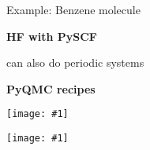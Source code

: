 \newcommand{\mycode}[1]{
\vspace{-1em}
\begin{minipage}[c]{.45\textwidth}

\end{minipage}
}

\newcommand{\mygraphic}[1]{
\begin{minipage}[c]{.48\textwidth}
\texttt{[image: \#1]}
\end{minipage}
}

\begin{frame}{Example: Benzene molecule}
\vspace{1em}
\begin{minipage}{1.05\textwidth}
\begin{minipage}[t]{0.35\textwidth}
{\bf HF with PySCF}


\vspace{1em}
{\footnotesize can also do periodic systems}

\end{minipage}
\hspace{2em}
\begin{minipage}[t]{0.58\textwidth}
{\bf PyQMC recipes}

\vspace{1em}
\mycode{snippets/fig_optimize_recipe.py}
\mygraphic{figures/benzene_linemin.pdf}

\vspace{1em}
\mycode{snippets/fig_vmc_and_dmc_recipe_lines.py}
\mygraphic{figures/benzene_both.pdf}


\end{minipage}
\end{minipage}

\end{frame}




